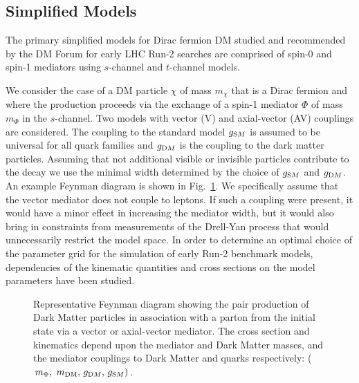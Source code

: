 \subsection{Simplified Models}


The primary simplified models for Dirac fermion DM studied and recommended by the DM Forum for early LHC Run-2 searches are comprised of spin-0 and spin-1 mediators using $s$-channel and $t$-channel models.

We consider the case of a DM particle $\chi$ of mass $m_{\chi}$ that is a Dirac fermion and where the production proceeds via the exchange
of a spin-1 mediator $\Phi$ of mass $m_{\Phi}$ in the $s$-channel. Two models with vector (V) and axial-vector (AV) couplings are considered. The coupling to the standard model
$g_{\textrm SM}$ is assumed to be universal for all quark families and $g_{\textrm DM}$ is the coupling to the dark matter particles. Assuming that not additional visible or invisible particles contribute to the decay we use the minimal width determined by the choice of $g_{\textrm SM}$ and $g_{\textrm DM}$. An example Feynman diagram is shown in Fig.~\ref{fig:feynman}.
We specifically assume that the vector mediator does not couple to leptons. If such a coupling were present, it would have a minor effect in increasing the mediator width, but it
would also bring in constraints from measurements of the Drell-Yan process that would unnecessarily restrict the model space. 
 In order to determine an optimal choice of the parameter grid for the simulation of early Run-2 benchmark models, dependencies of the kinematic quantities and cross sections on the model parameters have been studied. %

\begin{figure}[h!]
  \centering
  \caption{Representative Feynman diagram showing the pair production of Dark Matter particles in association with a parton from the initial state via a vector or axial-vector mediator. The cross section and kinematics depend upon the mediator and Dark Matter masses, and the mediator couplings to Dark Matter and quarks respectively: ($m_{\Phi} ,\ m_\textrm{DM} ,\, g_{\textrm DM} ,\, g_{\textrm SM})$. \cite{Abercrombie:2015wmb}}
  \label{fig:feynman}
\end{figure}


